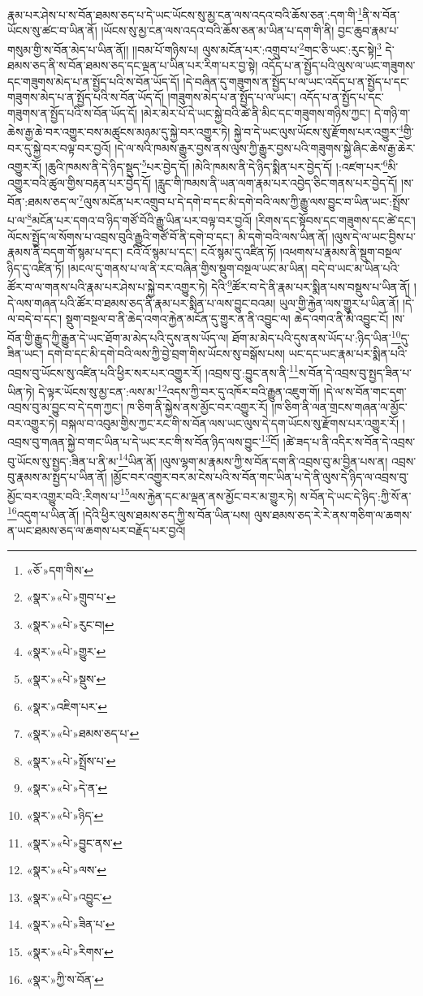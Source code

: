 རྣམ་པར་ཤེས་པ་ས་བོན་ཐམས་ཅད་པ་དེ་ཡང་ཡོངས་སུ་མྱ་ངན་ལས་འདའ་བའི་ཆོས་ཅན་:དག་གི་\footnote{«ཅོ་»དག་གིས་}ནི་ས་བོན་ཡོངས་སུ་ཚང་བ་ཡིན་ནོ། །ཡོངས་སུ་མྱ་ངན་ལས་འདའ་བའི་ཆོས་ཅན་མ་ཡིན་པ་དག་གི་ནི། བྱང་ཆུབ་རྣམ་པ་གསུམ་གྱི་ས་བོན་མེད་པ་ཡིན་ནོ།། །།བམ་པོ་གཉིས་པ། ལུས་མངོན་པར་:འགྲུབ་པ་\footnote{«སྣར་»«པེ་»གྲུབ་པ་}གང་ཅི་ཡང་:རུང་སྟེ།\footnote{«སྣར་»«པེ་»རུང་བ།} དེ་ཐམས་ཅད་ནི་ས་བོན་ཐམས་ཅད་དང་ལྡན་པ་ཡིན་པར་རིག་པར་བྱ་སྟེ། འདོད་པ་ན་སྤྱོད་པའི་ལུས་ལ་ཡང་གཟུགས་དང་གཟུགས་མེད་པ་ན་སྤྱོད་པའི་ས་བོན་ཡོད་དོ། །དེ་བཞིན་དུ་གཟུགས་ན་སྤྱོད་པ་ལ་ཡང་འདོད་པ་ན་སྤྱོད་པ་དང་གཟུགས་མེད་པ་ན་སྤྱོད་པའི་ས་བོན་ཡོད་དོ། །གཟུགས་མེད་པ་ན་སྤྱོད་པ་ལ་ཡང་། འདོད་པ་ན་སྤྱོད་པ་དང་གཟུགས་ན་སྤྱོད་པའི་ས་བོན་ཡོད་དོ། །མེར་མེར་པོ་དེ་ཡང་སྐྱེ་བའི་ཚེ་ནི་མིང་དང་གཟུགས་གཉིས་ཀྱང་། དེ་གཉི་ག་ཆེས་རྒྱ་ཆེ་བར་འགྱུར་བས་མཚུངས་མཉམ་དུ་སྐྱེ་བར་འགྱུར་ཏེ། སྐྱེ་བ་དེ་ཡང་ལུས་ཡོངས་སུ་རྫོགས་པར་འགྱུར་\footnote{«སྣར་»«པེ་»གྱུར་}གྱི་བར་དུ་སྐྱེ་བར་བལྟ་བར་བྱའོ། །དེ་ལ་སའི་ཁམས་རྒྱུར་བྱས་ནས་ལུས་ཀྱི་རྒྱུར་བྱས་པའི་གཟུགས་སྐྱེ་ཞིང་ཆེས་རྒྱ་ཆེར་འགྱུར་རོ། །ཆུའི་ཁམས་ནི་དེ་ཉིད་སྡུད་\footnote{«སྣར་»«པེ་»སྡུས་}པར་བྱེད་དོ། །མེའི་ཁམས་ནི་དེ་ཉིད་སྨིན་པར་བྱེད་དོ། །:འཛག་པར་\footnote{«སྣར་»འཇིག་པར་}མི་འགྱུར་བའི་ཚུལ་གྱིས་བརྟན་པར་བྱེད་དོ། །རླུང་གི་ཁམས་ནི་ཡན་ལག་རྣམ་པར་འབྱེད་ཅིང་གནས་པར་བྱེད་དོ། །ས་བོན་:ཐམས་ཅད་ལ་\footnote{«སྣར་»«པེ་»ཐམས་ཅད་པ་}ལུས་མངོན་པར་འགྲུབ་པ་དེ་དགེ་བ་དང་མི་དགེ་བའི་ལས་ཀྱི་རྒྱུ་ལས་བྱུང་བ་ཡིན་ཡང་:སྤྲོས་པ་ལ་\footnote{«སྣར་»«པེ་»སྤྲོས་པ་}མངོན་པར་དགའ་བ་ཉིད་གཙོ་བོའི་རྒྱུ་ཡིན་པར་བལྟ་བར་བྱའོ། །རིགས་དང་སྟོབས་དང་གཟུགས་དང་ཚེ་དང་། ལོངས་སྤྱོད་ལ་སོགས་པ་འབྲས་བུའི་རྒྱུའི་གཙོ་བོ་ནི་དགེ་བ་དང་། མི་དགེ་བའི་ལས་ཡིན་ནོ། །ལུས་དེ་ལ་ཡང་བྱིས་པ་རྣམས་ནི་བདག་གོ་སྙམ་པ་དང་། ངའི་འོ་སྙམ་པ་དང་། ངའོ་སྙམ་དུ་འཛིན་ཏོ། །འཕགས་པ་རྣམས་ནི་སྡུག་བསྔལ་ཉིད་དུ་འཛིན་ཏོ། །མངལ་དུ་གནས་པ་ལ་ནི་རང་བཞིན་གྱིས་སྡུག་བསྔལ་ཡང་མ་ཡིན། བདེ་བ་ཡང་མ་ཡིན་པའི་ཚོར་བ་ལ་གནས་པའི་རྣམ་པར་ཤེས་པ་སྐྱེ་བར་འགྱུར་ཏེ། དེའི་\footnote{«སྣར་»«པེ་»དེ་ན་}ཚོར་བ་དེ་ནི་རྣམ་པར་སྨིན་པས་བསྡུས་པ་ཡིན་ནོ། །དེ་ལས་གཞན་པའི་ཚོར་བ་ཐམས་ཅད་ནི་རྣམ་པར་སྨིན་པ་ལས་བྱུང་བའམ། ཡུལ་གྱི་རྐྱེན་ལས་གྱུར་པ་ཡིན་ནོ། །དེ་ལ་བདེ་བ་དང་། སྡུག་བསྔལ་བ་ནི་ཆེད་འགའ་རྐྱེན་མངོན་དུ་གྱུར་ན་ནི་འབྱུང་ལ། ཆེད་འགའ་ནི་མི་འབྱུང་ངོ། །ས་བོན་གྱི་རྒྱུད་ཀྱི་རྒྱུན་དེ་ཡང་ཐོག་མ་མེད་པའི་དུས་ནས་ཡོད་ལ། ཐོག་མ་མེད་པའི་དུས་ནས་ཡོད་པ་:ཉིད་ཡིན་\footnote{«སྣར་»«པེ་»ཉིད་}དུ་ཟིན་ཡང་། དགེ་བ་དང་མི་དགེ་བའི་ལས་ཀྱི་བྱེ་བྲག་གིས་ཡོངས་སུ་བསྒོས་པས། ཡང་དང་ཡང་རྣམ་པར་སྨིན་པའི་འབྲས་བུ་ཡོངས་སུ་འཛིན་པའི་ཕྱིར་སར་པར་འགྱུར་རོ། །འབྲས་བུ་:བྱུང་ནས་ནི་\footnote{«སྣར་»«པེ་»བྱུང་ནས་}ས་བོན་དེ་འབྲས་བུ་སྤྱད་ཟིན་པ་ཡིན་ཏེ། དེ་ལྟར་ཡོངས་སུ་མྱ་ངན་:ལས་མ་\footnote{«སྣར་»«པེ་»ལས་}འདས་ཀྱི་བར་དུ་འཁོར་བའི་རྒྱུན་འཇུག་གོ། །དེ་ལ་ས་བོན་གང་དག་འབྲས་བུ་མ་བྱུང་བ་དེ་དག་ཀྱང་། ཁ་ཅིག་ནི་སྐྱེས་ནས་མྱོང་བར་འགྱུར་རོ། །ཁ་ཅིག་ནི་ལན་གྲངས་གཞན་ལ་མྱོང་བར་འགྱུར་ཏེ། བསྐལ་བ་འབུམ་གྱིས་ཀྱང་རང་གི་ས་བོན་ལས་ཡང་ལུས་དེ་དག་ཡོངས་སུ་རྫོགས་པར་འགྱུར་རོ། །འབྲས་བུ་གཞན་སྐྱེ་བ་གང་ཡིན་པ་དེ་ཡང་རང་གི་ས་བོན་ཉིད་ལས་བྱུང་\footnote{«སྣར་»«པེ་»འབྱུང་}ངོ། །ཚེ་ཟད་པ་ནི་འདིར་ས་བོན་དེ་འབྲས་བུ་ཡོངས་སུ་སྤྱད་:ཟིན་པ་ནི་མ་\footnote{«སྣར་»«པེ་»ཟིན་པ་}ཡིན་ནོ། །ལུས་ལྷག་མ་རྣམས་ཀྱི་ས་བོན་དག་ནི་འབྲས་བུ་མ་བྱིན་པས་ན། འབྲས་བུ་རྣམས་མ་སྤྱད་པ་ཡིན་ནོ། །མྱོང་བར་འགྱུར་བར་མ་ངེས་པའི་ས་བོན་གང་ཡིན་པ་དེ་ནི་ལུས་དེ་ཉིད་ལ་འབྲས་བུ་མྱོང་བར་འགྱུར་བའི་:རིགས་པ་\footnote{«སྣར་»«པེ་»རིགས་}ལས་རྐྱེན་དང་མ་ལྡན་ནས་མྱོང་བར་མ་གྱུར་ཏེ། ས་བོན་དེ་ཡང་དེ་ཉིད་:ཀྱི་སོ་ན་\footnote{«སྣར་»ཀྱི་ས་བོན་}འདུག་པ་ཡིན་ནོ། །དེའི་ཕྱིར་ལུས་ཐམས་ཅད་ཀྱི་ས་བོན་ཡིན་པས། ལུས་ཐམས་ཅད་རེ་རེ་ནས་གཅིག་ལ་ཆགས་ན་ཡང་ཐམས་ཅད་ལ་ཆགས་པར་བརྗོད་པར་བྱའོ། 
